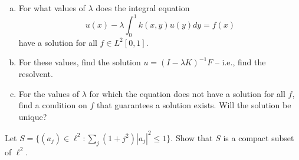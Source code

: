 \documentclass{article}
\begin{document}
\begin{enumerate}[a.]
\item For what values of $\lambda$ does the integral equation
$$u(x) - \lambda \int_0^1 k(x,y) u(y) dy = f(x)$$
have a solution for all $f \in L^2[0,1]$.
\item For these values, find the solution $u = (I - \lambda K)^{-1} F$ -- i.e., find the resolvent.
\item For the values of $\lambda$ for which the equation does not have a solution for all $f$, find a condition on $f$ that guarantees a solution exists. Will the solution be unique?
\end{enumerate}

 Let $S = \{ (a_j) \in \ell^2 : \sum_j (1+j^2)|a_j|^2 \le 1 \}$. Show that $S$ is a compact subset of $\ell^2$.
\end{document}
